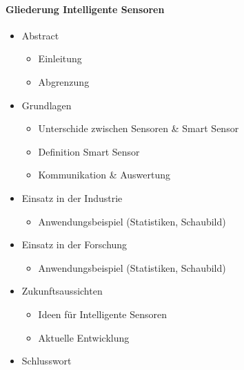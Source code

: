 \documentclass[a4paper,12pt]{scrartcl}
\begin{document}
\paragraph{Gliederung Intelligente Sensoren}

\begin{itemize}
\item Abstract
	\begin{itemize}
	\item Einleitung
	\item Abgrenzung
	\end{itemize}
\item Grundlagen
\begin{itemize}
	\item Unterschide zwischen Sensoren \& Smart Sensor
	\item Definition Smart Sensor
	\item Kommunikation \& Auswertung
	\end{itemize}
\item Einsatz in der Industrie
\begin{itemize}
	\item Anwendungsbeispiel (Statistiken, Schaubild)
	\end{itemize}
\item Einsatz in der Forschung
\begin{itemize}
	\item Anwendungsbeispiel (Statistiken, Schaubild)
	\end{itemize}
\item Zukunftsaussichten
\begin{itemize}
	\item Ideen für Intelligente Sensoren
	\item Aktuelle Entwicklung
	\end{itemize}
\item Schlusswort
\end{itemize}
\end{document}
